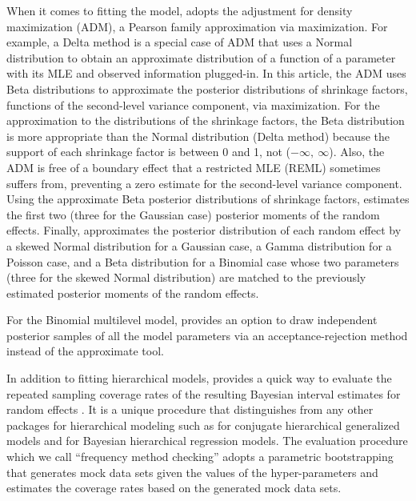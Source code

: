 \documentclass[article]{jss}
\begin{document}
When it comes to fitting the model,  adopts the adjustment for density maximization \citep{carl1988, morris1997, tang2011} (ADM), a Pearson family approximation via maximization. For example, a Delta method is a special case of ADM that uses a Normal distribution to obtain an approximate distribution of a function of a parameter with its MLE and observed information plugged-in. In this article, the ADM uses Beta distributions to approximate the posterior distributions of shrinkage factors, functions of the second-level variance component, via maximization. For the approximation to the distributions of the shrinkage factors, the Beta distribution  is more appropriate than the Normal distribution (Delta method) because the support of each shrinkage factor is between 0 and 1, not ($-\infty,~\infty$). Also, the ADM is free of a boundary effect that a restricted MLE \citep{patterson1971recovery} (REML) sometimes suffers from, preventing a zero estimate for the second-level variance component. Using the approximate Beta posterior distributions of shrinkage factors,  estimates the first two (three for the Gaussian case) posterior moments of the random effects. Finally,  approximates the posterior distribution of each random effect by a skewed Normal distribution for a Gaussian case, a Gamma distribution for a Poisson case, and a Beta distribution for a Binomial case whose two parameters (three for the skewed Normal distribution) are matched to the previously estimated posterior moments of the random effects. 

For the Binomial  multilevel model,  provides an option to draw independent posterior samples of all the model parameters via an acceptance-rejection method instead of the approximate tool.


In addition to fitting hierarchical models,  provides a quick way to evaluate the repeated sampling coverage rates of the resulting Bayesian interval estimates for random effects \citep{morris1997, daniels1999prior, tang2002fitting, tang2011, morris2012}. It is a unique procedure that distinguishes   from any other  packages for hierarchical modeling such as  \citep{hglm2010, ronnegaard2011hglm} for conjugate hierarchical generalized models and  \citep{gelman2014arm} for Bayesian hierarchical regression models. The evaluation procedure which we call ``frequency method checking'' adopts a parametric bootstrapping that generates mock data sets given the values of the hyper-parameters and estimates the coverage rates based on the generated mock data sets.
\end{document}
